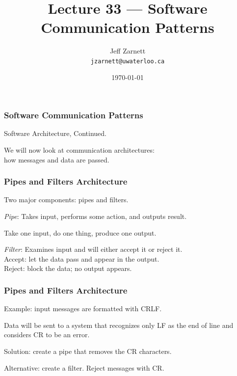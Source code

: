 

\title{Lecture 33 --- Software Communication Patterns}

\author{Jeff Zarnett \\ \small \texttt{jzarnett@uwaterloo.ca}}
\date{\today}




\begin{frame}
  \titlepage
\end{frame}

\begin{frame}
\frametitle{Software Communication Patterns}

\begin{changemargin}{1cm}
Software Architecture, Continued.

We will now look at communication architectures:\\
\quad how messages and data are passed.
\end{changemargin}
\end{frame}

\begin{frame}
\frametitle{Pipes and Filters Architecture}

\begin{changemargin}{1cm}
Two major components: pipes and filters.

\emph{Pipe}: Takes input, performs some action, and outputs result.

Take one input, do one thing, produce one output.

\emph{Filter}: Examines input and will either accept it or reject it.\\
\quad Accept: let the data pass and appear in the output.\\
\quad Reject: block the data; no output appears.

\end{changemargin}
\end{frame}

\begin{frame}
\frametitle{Pipes and Filters Architecture}

\begin{changemargin}{1cm}
Example: input messages are formatted with CRLF.

Data will be sent to a system that recognizes only LF as the end of line and considers CR to be an error.

Solution: create a pipe that removes the CR characters.

Alternative: create a filter. Reject messages with CR.

\end{changemargin}
\end{frame}

